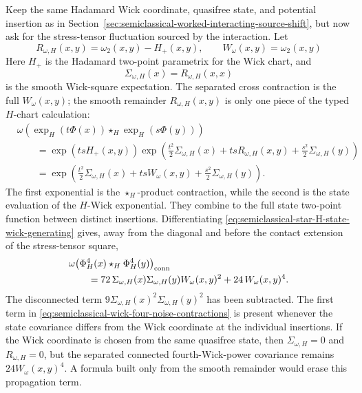\begin{controlledapproximation}
\label{ca:semiclassical-interacting-potential-noise}
Keep the same Hadamard Wick coordinate, quasifree state, and potential
insertion as in
Section~\ref{sec:semiclassical-worked-interacting-source-shift}, but now ask
for the stress-tensor fluctuation sourced by the interaction.  Let
\[
  R_{\omega,H}(x,y)
  =
  \omega_2(x,y)-H_+(x,y),
  \qquad
  W_\omega(x,y)=\omega_2(x,y)
\]
Here \(H_+\) is the Hadamard two-point parametrix for the Wick chart, and
\[
  \Sigma_{\omega,H}(x)=R_{\omega,H}(x,x)
\]
is the smooth Wick-square expectation.  The separated cross contraction is the
full \(W_\omega(x,y)\); the smooth remainder \(R_{\omega,H}(x,y)\) is only one
piece of the typed \(H\)-chart calculation:
\begin{equation}
\begin{aligned}
  &\omega\!\left(
    \exp_H(t\Phi(x))\star_H\exp_H(s\Phi(y))
  \right) \\
  &\qquad =
  \exp\!\left(t s H_+(x,y)\right)
  \exp\!\left(
    \frac{t^2}{2}\Sigma_{\omega,H}(x)
    +t s R_{\omega,H}(x,y)
    +\frac{s^2}{2}\Sigma_{\omega,H}(y)
  \right) \\
  &\qquad =
  \exp\!\left(
    \frac{t^2}{2}\Sigma_{\omega,H}(x)
    +t s W_\omega(x,y)
    +\frac{s^2}{2}\Sigma_{\omega,H}(y)
  \right).
\end{aligned}
  \label{eq:semiclassical-star-H-state-wick-generating}
\end{equation}
The first exponential is the \(\star_H\)-product contraction, while the second
is the state evaluation of the \(H\)-Wick exponential.  They combine to the full
state two-point function between distinct insertions.  Differentiating
\eqref{eq:semiclassical-star-H-state-wick-generating} gives, away from the
diagonal and before the contact extension of the stress-tensor square,
\begin{equation}
\begin{aligned}
  &\omega\!\left(
    \Phi_H^4(x)\star_H\Phi_H^4(y)
  \right)_{\rm conn}
  \\
  &\qquad =
  72\,
  \Sigma_{\omega,H}(x)\Sigma_{\omega,H}(y)
  W_\omega(x,y)^2
  +
  24\,W_\omega(x,y)^4 .
\end{aligned}
  \label{eq:semiclassical-wick-four-noise-contractions}
\end{equation}
The disconnected term
\(9\Sigma_{\omega,H}(x)^2\Sigma_{\omega,H}(y)^2\) has been subtracted.  The
first term in
\eqref{eq:semiclassical-wick-four-noise-contractions} is present whenever
the state covariance differs from the Wick coordinate at the individual
insertions.  If the Wick coordinate is chosen from the same quasifree state,
then \(\Sigma_{\omega,H}=0\) and \(R_{\omega,H}=0\), but the separated
connected fourth-Wick-power covariance remains
\(24W_\omega(x,y)^4\).  A formula built only from the smooth remainder would
erase this propagation term.


\end{controlledapproximation}
